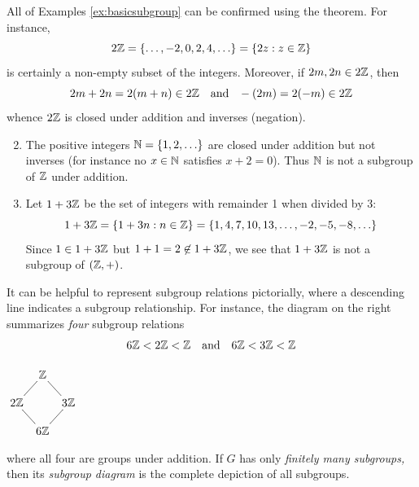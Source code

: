 \vspace{-5pt}

\begin{examples}{}{}
	\exstart All of Examples \ref{ex:basicsubgroup} can be confirmed using the theorem. For instance,
	\[
		2\mathbb{Z}=\{\ldots,-2,0,2,4,\ldots\}=\{2z:z\in\mathbb{Z}\}
	\]
	is certainly a non-empty subset of the integers. Moreover, if $2m,2n\in 2\mathbb{Z}$, then
	\[
		2m+2n=2(m+n)\in 2\mathbb{Z}\quad \text{and}\quad \!-(2m)=2(-m)\in 2\mathbb{Z}
	\]
	whence $2\mathbb{Z}$ is closed under addition and inverses (negation).
	\begin{enumerate}\setcounter{enumi}{1}
	  \item The positive integers $\mathbb{N}=\{1,2,\ldots \}$ are closed under addition but not inverses (for instance no $x\in\mathbb{N}$ satisfies $x+2=0$). Thus $\mathbb{N}$ is not a subgroup of $\mathbb{Z}$ under addition.
		\item\label{intro:modex} Let $1+3\mathbb{Z}$ be the set of integers with remainder 1 when divided by 3:
		\[
			1+3\mathbb{Z}=\{1+3n:n\in\mathbb{Z}\}=\{1,4,7,10,13,\ldots, -2,-5,-8,\ldots\}
		\]
		Since $1\in 1+3\mathbb{Z}$ but $1+1=2\not\in 1+3\mathbb{Z}$, we see that $1+3\mathbb{Z}$ is not a subgroup of $(\mathbb{Z},+)$.
	\end{enumerate}
\end{examples}


\goodbreak


\begin{minipage}[t]{0.83\linewidth}\vspace{0pt}
	
	It can be helpful to represent subgroup relations pictorially, where a descending line indicates a subgroup relationship. For instance, the diagram on the right summarizes \emph{four} subgroup relations
	\[
		6\mathbb{Z}<2\mathbb{Z}<\mathbb{Z}\quad\text{and}\quad 6\mathbb{Z}<3\mathbb{Z}<\mathbb{Z}
	\]
\end{minipage}
\hfill
\begin{minipage}[t]{0.15\linewidth}\vspace{0pt}
	\flushright$\xymatrix @C5pt @R12pt{%
		& \Z \ar@{-}[dl] \ar@{-}[dr] &\\
		2\Z \ar@{-}[dr] & & 3\Z \ar@{-}[dl]\\
		& 6\Z &\\
	}$
\end{minipage}
\medbreak
where all four are groups under addition. If $G$ has only \emph{finitely many subgroups,} then its \emph{subgroup diagram} is the complete depiction of all subgroups.



